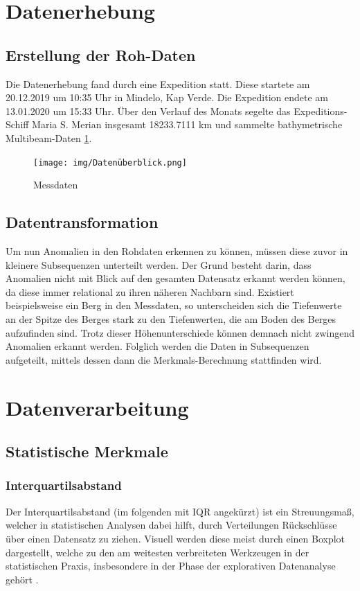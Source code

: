 \section{Datenerhebung}
\subsection{Erstellung der Roh-Daten}
Die Datenerhebung fand durch eine Expedition statt. Diese startete am 20.12.2019 um 10:35 Uhr in Mindelo, Kap Verde. Die Expedition endete am 13.01.2020 um 15:33 Uhr. Über den Verlauf des Monats segelte das Expeditions-Schiff Maria S. Merian insgesamt 18233.7111 km und sammelte bathymetrische Multibeam-Daten \ref{fig:datenüberblick}.

\begin{figure}[h!]
	\texttt{[image: img/Datenüberblick.png]}
	\caption[Gemessene Daten - Überblick]{Messdaten}
	\label{fig:datenüberblick}
\end{figure}

\subsection{Datentransformation}
Um nun Anomalien in den Rohdaten erkennen zu können, müssen diese zuvor in kleinere Subsequenzen unterteilt werden. Der Grund besteht darin, dass Anomalien nicht mit Blick auf den gesamten Datensatz erkannt werden können, da diese immer relational zu ihren näheren Nachbarn sind. Existiert beispielsweise ein Berg in den Messdaten, so unterscheiden sich die Tiefenwerte an der Spitze des Berges stark zu den Tiefenwerten, die am Boden des Berges aufzufinden sind. Trotz dieser Höhenunterschiede können demnach nicht zwingend Anomalien erkannt werden. \newline
Folglich werden die Daten in Subsequenzen aufgeteilt, mittels dessen dann die Merkmals-Berechnung stattfinden wird.


\section{Datenverarbeitung}
\subsection{Statistische Merkmale}
\subsubsection{Interquartilsabstand}
Der Interquartilsabstand (im folgenden mit IQR angekürzt) ist ein Streuungsmaß, welcher in statistischen Analysen dabei hilft, durch Verteilungen Rückschlüsse über einen Datensatz zu ziehen. Visuell werden diese meist durch einen Boxplot dargestellt, welche zu den am weitesten verbreiteten Werkzeugen in der statistischen Praxis, insbesondere in der Phase der explorativen Datenanalyse gehört \cite{dovoedoBoxplotBasedOutlierDetection2015}.
